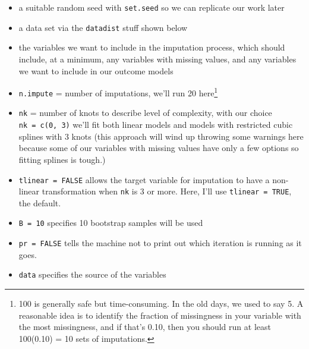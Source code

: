 \documentclass[]{book}
\providecommand{\tightlist}{%
  \setlength{\itemsep}{0pt}\setlength{\parskip}{0pt}}
\let\rmarkdownfootnote\footnote%
\def\footnote{\protect\rmarkdownfootnote}
\theoremstyle{definition}
\theoremstyle{definition}
\theoremstyle{definition}
\theoremstyle{remark}
\begin{document}
\begin{itemize}
\tightlist
\item
  a suitable random seed with \texttt{set.seed} so we can replicate our
  work later
\item
  a data set via the \texttt{datadist} stuff shown below
\item
  the variables we want to include in the imputation process, which
  should include, at a minimum, any variables with missing values, and
  any variables we want to include in our outcome models
\item
  \texttt{n.impute} = number of imputations, we'll run 20 here\footnote{100
    is generally safe but time-consuming. In the old days, we used to
    say 5. A reasonable idea is to identify the fraction of missingness
    in your variable with the most missingness, and if that's 0.10, then
    you should run at least 100(0.10) = 10 sets of imputations.}
\item
  \texttt{nk} = number of knots to describe level of complexity, with
  our choice \texttt{nk\ =\ c(0,\ 3)} we'll fit both linear models and
  models with restricted cubic splines with 3 knots (this approach will
  wind up throwing some warnings here because some of our variables with
  missing values have only a few options so fitting splines is tough.)
\item
  \texttt{tlinear\ =\ FALSE} allows the target variable for imputation
  to have a non-linear transformation when \texttt{nk} is 3 or more.
  Here, I'll use \texttt{tlinear\ =\ TRUE}, the default.
\item
  \texttt{B\ =\ 10} specifies 10 bootstrap samples will be used
\item
  \texttt{pr\ =\ FALSE} tells the machine not to print out which
  iteration is running as it goes.
\item
  \texttt{data} specifies the source of the variables
\end{itemize}
\end{document}
